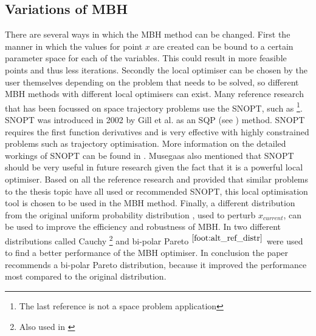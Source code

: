 \subsection{Variations of \ac{MBH}}
\label{subsec:varmbhmeth}
There are several ways in which the \ac{MBH} method can be changed.
First the manner in which the values for point $x$ are created can be bound to a certain parameter space for each of the variables. This could result in more feasible points and thus less iterations. Secondly the local optimiser can be chosen by the user themselves depending on the problem that needs to be solved, so different \ac{MBH} methods with different local optimisers can exist. Many reference research that has been focussed on space trajectory problems use the \ac{SNOPT}, such as \cite{yam2011low,englander2012automated,englander2014mars,jamali2009packing} \footnote{The last reference is not a space problem application}. \ac{SNOPT} was introduced in 2002 by Gill et al. \cite{gill2002snopt} as an \ac{SQP} (see ) method. \ac{SNOPT} requires the first function derivatives and is very effective with highly constrained problems such as trajectory optimisation. More information on the detailed workings of \ac{SNOPT} can be found in \cite{gill2002snopt,gill2006user}. Musegaas \cite{musegaas2012} also mentioned that \ac{SNOPT} should be very useful in future research given the fact that it is a powerful local optimiser. Based on all the reference research and provided that similar problems to the thesis topic have all used or recommended \ac{SNOPT}, this local optimisation tool is chosen to be used in the \ac{MBH} method. Finally, a different distribution from the original uniform probability distribution \cite{jamali2009packing}, used to perturb $x_{current}$, can be used to improve the efficiency and robustness of \ac{MBH}. In \cite{englander2014tuning} two different distributions called Cauchy \footnote{\label{foot:alt_ref_distr} Also used in \cite{englander2012automated}} and bi-polar Pareto $^{\ref{foot:alt_ref_distr}}$ were used to find a better performance of the \ac{MBH} optimiser. In conclusion the paper recommends a bi-polar Pareto distribution, because it improved the performance most compared to the original distribution.







